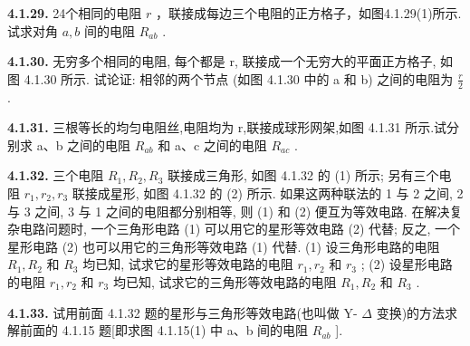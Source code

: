 \vfill
\newpage

\textbf{4.1.29.} 24个相同的电阻 $r$ ，联接成每边三个电阻的正方格子，如图4.1.29(1)所示.试求对角 $a, b$ 间的电阻 $R_{ab}$ .

\begin{center}
\end{center}

\vfill
\newpage

\textbf{4.1.30.} 无穷多个相同的电阻, 每个都是 r, 联接成一个无穷大的平面正方格子, 如图 4.1.30 所示. 试论证: 相邻的两个节点 (如图 4.1.30 中的 a 和 b) 之间的电阻为 $\displaystyle \frac{r}{2}$ .

\begin{center}
\end{center}

\vfill
\newpage

\textbf{4.1.31.} 三根等长的均匀电阻丝,电阻均为 r,联接成球形网架,如图 4.1.31 所示.试分别求 a、b 之间的电阻 $R_{ab}$ 和 a、c 之间的电阻 $R_{ac}$ .

\vfill
\newpage

\textbf{4.1.32.} 三个电阻 $R_{1}, R_{2}, R_{3}$ 联接成三角形, 如图 4.1.32 的 (1) 所示; 另有三个电阻 $r_{1}, r_{2}, r_{3}$ 联接成星形, 如图 4.1.32 的 (2) 所示. 如果这两种联法的 1 与 2 之间, 2 与 3 之间, 3 与 1 之间的电阻都分别相等, 则 (1) 和 (2) 便互为等效电路. 在解决复杂电路问题时, 一个三角形电路 (1) 可以用它的星形等效电路 (2) 代替; 反之, 一个星形电路 (2) 也可以用它的三角形等效电路 (1) 代替. (1) 设三角形电路的电阻 $R_{1}, R_{2}$ 和 $R_{3}$ 均已知, 试求它的星形等效电路的电阻 $r_{1}, r_{2}$ 和 $r_{3}$ ; (2) 设星形电路的电阻 $r_{1}, r_{2}$ 和 $r_{3}$ 均已知, 试求它的三角形等效电路的电阻 $R_{1}, R_{2}$ 和 $R_{3}$ .

\begin{center}
  \begin{minipage}[b]{0.47\linewidth}
    \centering
  \end{minipage}\hfill
  \begin{minipage}[b]{0.47\linewidth}
    \centering
  \end{minipage}
\end{center}

\vfill
\newpage

\textbf{4.1.33.} 试用前面 4.1.32 题的星形与三角形等效电路(也叫做 Y- $\Delta$ 变换)的方法求解前面的 4.1.15 题[即求图 4.1.15(1) 中 a、b 间的电阻 $R_{ab}$ ].

